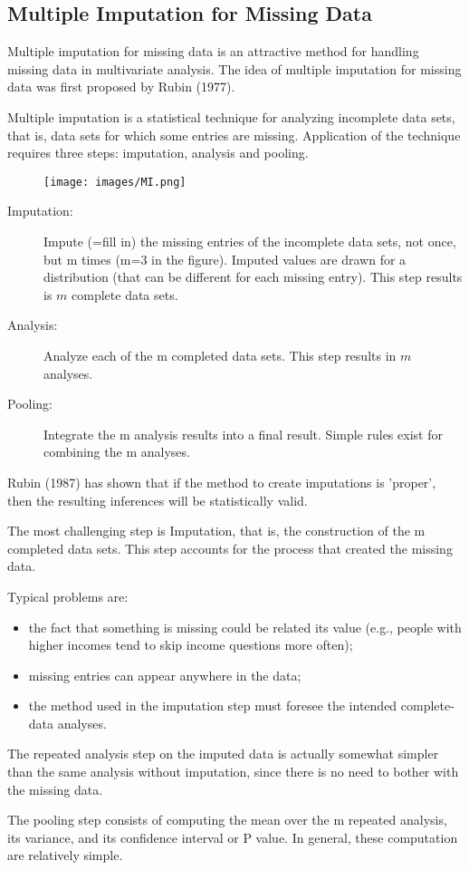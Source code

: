 \documentclass[a4paper,12pt]{article}
\begin{document}
\subsection*{Multiple Imputation for Missing Data}
\smallskip
\noindent Multiple imputation for missing data is an attractive method for handling missing data in multivariate analysis. The idea of multiple imputation for missing data was first proposed by Rubin (1977).

\smallskip

Multiple imputation is a statistical technique for analyzing incomplete data sets, that is, data sets for which some entries are missing. Application of the technique requires three steps: imputation, analysis and pooling. 

\begin{figure}[h!]
\centering
\texttt{[image: images/MI.png]}
\end{figure}


\begin{description}
\item[Imputation:] Impute (=fill in) the missing entries of the incomplete data sets, not once, but m times (m=3 in the figure). Imputed values are drawn for a distribution (that can be different for each missing entry). This step results is $m$ complete data sets. 
\item[Analysis:] Analyze each of the m completed data sets. This step results in $m$ analyses.
\item[Pooling:] Integrate the m analysis results into a final result. Simple rules exist for combining the m analyses.
\end{description}
Rubin (1987) has shown that if the method to create imputations is 'proper', then the resulting inferences will be statistically valid.

\smallskip
\noindent  The most challenging step is Imputation, that is, the construction of the m completed data sets. This step accounts for the process that created the missing data. 

\smallskip
\noindent Typical problems are:
\begin{itemize}
    \item  the fact that something is missing could be related its value (e.g., people with higher incomes tend to skip income questions more often);
    \item  missing entries can appear anywhere in the data;
    \item  the method used in the imputation step must foresee the intended complete-data analyses.
\end{itemize}

\noindent The repeated analysis step on the imputed data is actually somewhat simpler than the same analysis without imputation, since there is no need to bother with the missing data.

\noindent The pooling step consists of computing the mean over the m repeated analysis, its variance, and its confidence interval or P value. In general, these computation are relatively simple.
\end{document}
